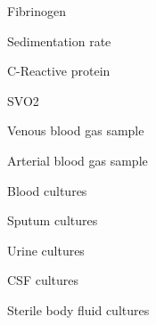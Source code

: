 \documentclass{sig-alternate}
\begin{document}
\begin{itemize*}
  \item Fibrinogen \vspace{3pt}
  \item Sedimentation rate \vspace{3pt}
  \item C-Reactive protein \vspace{3pt}
  \item SVO2 \vspace{3pt}
  \item Venous blood gas sample \vspace{3pt}
  \item Arterial blood gas sample \vspace{3pt}
  \item Blood cultures \vspace{3pt}
  \item Sputum cultures \vspace{3pt}
  \item Urine cultures \vspace{3pt}
  \item CSF cultures \vspace{3pt}
  \item Sterile body fluid cultures \vspace{3pt}
\end{itemize*}
\end{document}
